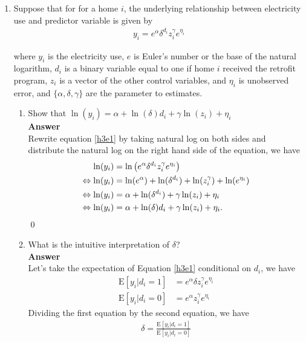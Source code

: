 \documentclass{article}
\newcommand{\E}{\text{E}}
\begin{document}
\begin{enumerate}
\item Suppose that for for a home $i$, the underlying relationship between electricity use and predictor variable is given by 
\begin{align}
    y_i=e^\alpha\delta^{d_i}z_i^{\gamma}e^{\eta_i} \label{h3e1}
\end{align}

where $y_i$ is the electricity use, $e$ is Euler's number or the base of the natural logarithm, $d_i$ is a binary variable equal to one if home $i$ received the retrofit program, $z_i$ is a vector of the other control variables, and $\eta_i$ is unobserved error, and $\{\alpha,\delta,\gamma\}$ are the parameter to estimates.

\begin{enumerate}
    \item Show that $\ln(y_i)=\alpha+\ln(\delta)d_i+\gamma\ln(z_i)+\eta_i$
    \\\textbf{Answer}\\
    Rewrite equation \eqref{h3e1} by taking natural log on both sides and distribute the natural log on the right hand side of the equation, we have
    \begin{align}
         \ln(y_i)&=\ln\left(e^\alpha\delta^{d_i}z_i^{\gamma}e^{\eta_i}\right) \notag\\
        \Leftrightarrow\ln(y_i)&=\ln(e^\alpha)+\ln(\delta^{d_i})+\ln(z_i^{\gamma})+\ln(e^{\eta_i}) \notag\\
        \Leftrightarrow\ln(y_i)&=\alpha+\ln(\delta^{d_i})+\gamma\ln(z_i)+\eta_i \notag\\
        \Leftrightarrow\ln(y_i)&=\alpha+\ln(\delta)d_i+\gamma\ln(z_i)+\eta_i\label{h3e2}.
    \end{align}\qed
    \item What is the intuitive interpretation of $\delta$?
    \\\textbf{Answer}\\
    Let's take the expectation of Equation \eqref{h3e1} conditional on $d_i$, we have
    \begin{align}
        \E[y_i|d_i=1]&=e^\alpha\delta z_i^{\gamma}e^{\eta_i}\\
        \E[y_i|d_i=0]&=e^\alpha z_i^{\gamma}e^{\eta_i}
    \end{align}
    Dividing the first equation by the second equation, we have
    \begin{align}
        \delta=\frac{\E[y_i|d_i=1]}{\E[y_i|d_i=0]} \label{h3e5} 
    \end{align}

\end{enumerate}
\end{enumerate}
\end{document}
